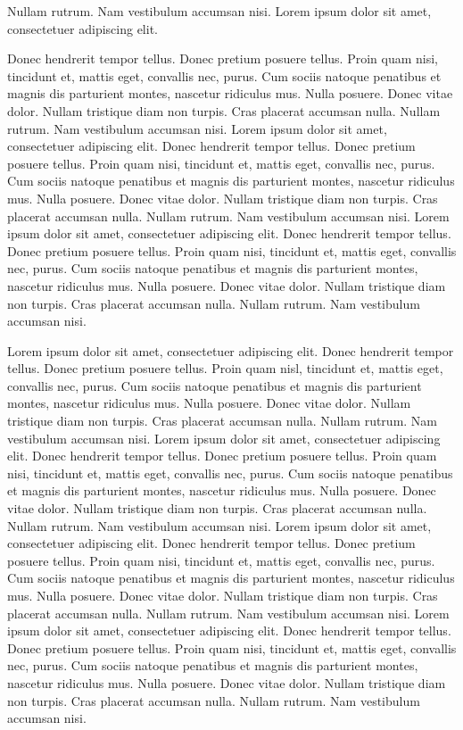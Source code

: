 \documentclass[12pt]{report}
\begin{document}
\begin{eg}
Nullam rutrum. Nam vestibulum accumsan nisi.  Lorem ipsum dolor sit
amet, consectetuer adipiscing elit. 
\end{eg}
Donec hendrerit tempor tellus. Donec pretium posuere tellus. Proin
quam nisi, tincidunt et, mattis eget, convallis nec, purus. Cum sociis
natoque penatibus et magnis dis parturient montes, nascetur ridiculus
mus. Nulla posuere. Donec vitae dolor. Nullam tristique diam non
turpis. Cras placerat accumsan nulla. Nullam rutrum. Nam vestibulum
accumsan nisi.  Lorem ipsum dolor sit amet, consectetuer adipiscing
elit. Donec hendrerit tempor tellus. Donec pretium posuere
tellus. Proin quam nisi, tincidunt et, mattis eget, convallis nec,
purus. Cum sociis natoque penatibus et magnis dis parturient montes,
nascetur ridiculus mus. Nulla posuere. Donec vitae dolor. Nullam
tristique diam non turpis. Cras placerat accumsan nulla. Nullam
rutrum. Nam vestibulum accumsan nisi.  Lorem ipsum dolor sit amet,
consectetuer adipiscing elit. Donec hendrerit tempor tellus. Donec
pretium posuere tellus. Proin quam nisi, tincidunt et, mattis eget,
convallis nec, purus. Cum sociis natoque penatibus et magnis dis
parturient montes, nascetur ridiculus mus. Nulla posuere. Donec vitae
dolor. Nullam tristique diam non turpis. Cras placerat accumsan
nulla. Nullam rutrum. Nam vestibulum accumsan nisi.

Lorem ipsum dolor sit amet, consectetuer adipiscing elit. Donec
hendrerit tempor tellus. Donec pretium posuere tellus. Proin quam
nisl, tincidunt et, mattis eget, convallis nec, purus. Cum sociis
natoque penatibus et magnis dis parturient montes, nascetur ridiculus
mus. Nulla posuere. Donec vitae dolor. Nullam tristique diam non
turpis. Cras placerat accumsan nulla. Nullam rutrum. Nam vestibulum
accumsan nisi.  Lorem ipsum dolor sit amet, consectetuer adipiscing
elit. Donec hendrerit tempor tellus. Donec pretium posuere
tellus. Proin quam nisi, tincidunt et, mattis eget, convallis nec,
purus. Cum sociis natoque penatibus et magnis dis parturient montes,
nascetur ridiculus mus. Nulla posuere. Donec vitae dolor. Nullam
tristique diam non turpis. Cras placerat accumsan nulla. Nullam
rutrum. Nam vestibulum accumsan nisi.  Lorem ipsum dolor sit amet,
consectetuer adipiscing elit. Donec hendrerit tempor tellus. Donec
pretium posuere tellus. Proin quam nisi, tincidunt et, mattis eget,
convallis nec, purus. Cum sociis natoque penatibus et magnis dis
parturient montes, nascetur ridiculus mus. Nulla posuere. Donec vitae
dolor. Nullam tristique diam non turpis. Cras placerat accumsan
nulla. Nullam rutrum. Nam vestibulum accumsan nisi.  Lorem ipsum dolor
sit amet, consectetuer adipiscing elit. Donec hendrerit tempor
tellus. Donec pretium posuere tellus. Proin quam nisi, tincidunt et,
mattis eget, convallis nec, purus. Cum sociis natoque penatibus et
magnis dis parturient montes, nascetur ridiculus mus. Nulla
posuere. Donec vitae dolor. Nullam tristique diam non turpis. Cras
placerat accumsan nulla. Nullam rutrum. Nam vestibulum accumsan nisi.
\end{document}
